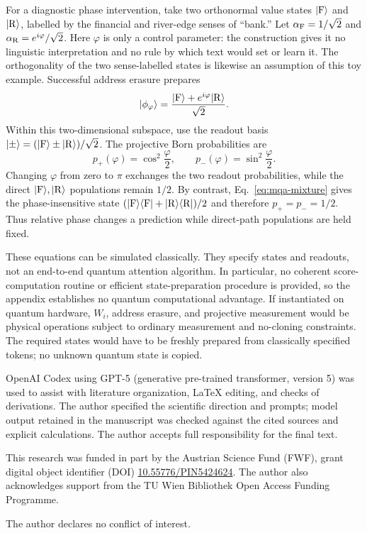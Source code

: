 \documentclass[
  aps,
  reprint,
  superscriptaddress,
  floatfix,
  nofootinbib,
  longbibliography
]{revtex4-2}
\begin{document}
For a diagnostic phase intervention, take two orthonormal value states
$|{\rm F}\rangle$ and $|{\rm R}\rangle$, labelled by the financial and
river-edge senses of ``bank.''  Let
$\alpha_{\rm F}=1/\sqrt2$ and
$\alpha_{\rm R}=e^{i\varphi}/\sqrt2$.  Here $\varphi$ is only a control
parameter: the construction gives it no linguistic interpretation and no rule
by which text would set or learn it.  The orthogonality of the two
sense-labelled states is likewise an assumption of this toy example.
Successful address erasure prepares
\begin{equation}
 |\phi_\varphi\rangle
 =\frac{|{\rm F}\rangle+e^{i\varphi}|{\rm R}\rangle}{\sqrt2}.
\label{eq:mqa-bank-state}
\end{equation}
Within this two-dimensional subspace, use the readout basis
$|\mathord{\pm}\rangle=(|{\rm F}\rangle\pm|{\rm R}\rangle)/\sqrt2$.
The projective Born probabilities are
\begin{equation}
 p_+(\varphi)=\cos^2\frac{\varphi}{2},\qquad
 p_-(\varphi)=\sin^2\frac{\varphi}{2}.
\label{eq:mqa-bank-fringe}
\end{equation}
Changing $\varphi$ from zero to $\pi$ exchanges the two readout probabilities,
while the direct $|{\rm F}\rangle,|{\rm R}\rangle$ populations remain $1/2$.
By contrast, Eq.~\eqref{eq:mqa-mixture} gives the phase-insensitive state
$(|{\rm F}\rangle\langle{\rm F}|
 +|{\rm R}\rangle\langle{\rm R}|)/2$ and therefore $p_+=p_-=1/2$.
Thus relative phase changes a prediction while direct-path populations are
held fixed.

These equations can be simulated classically.  They specify states and
readouts, not an end-to-end quantum attention algorithm.  In particular, no
coherent score-computation routine or efficient state-preparation procedure is
provided, so the appendix establishes no quantum computational advantage.  If
instantiated on quantum hardware, $W_i$, address erasure, and projective
measurement would be physical operations subject to ordinary measurement and
no-cloning constraints.  The required states would have to be freshly
prepared from classically specified tokens; no unknown quantum state is
copied.


\begin{acknowledgments}
OpenAI Codex using GPT-5 (generative pre-trained transformer, version 5) was
used to assist with literature organization, \LaTeX{}
editing, and checks of derivations.  The author specified the scientific
direction and prompts; model output retained in the manuscript was checked
against the cited sources and explicit calculations.  The author accepts full
responsibility for the final text.

This research was funded in part by the Austrian Science Fund (FWF), grant
digital object identifier (DOI)
\href{https://doi.org/10.55776/PIN5424624}{10.55776/PIN5424624}.
The author also acknowledges support from the TU Wien Bibliothek Open Access
Funding Programme.

The author declares no conflict of interest.
\end{acknowledgments}


\end{document}
